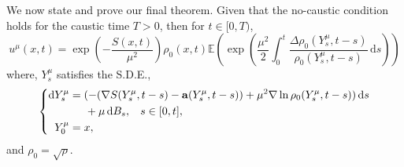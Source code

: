 \documentclass[a4paper,12pt,draft]{report}
\theoremstyle{remark}
\theoremstyle{definition}
\begin{document}
We now state and prove our final theorem.
\theorem
{
Given that the no-caustic condition holds for the caustic time $T > 0$, then for $t \in [0, T)$,
$$
u^\mu(x, t) = \exp\left(-\frac{S(x, t)}{\mu^2}\right)\rho_0(x, t)\mathbb{E}\left(\exp\left(\frac{\mu^2}{2}\int_0^t\frac{\Delta\rho_0(Y_s^\mu, t - s)}{\rho_0(Y_s^\mu, t - s)}\,\mathrm{d}s\right)\right)
$$
where, $Y_s^\mu$ satisfies the S.D.E.,
$$
\left\{
\begin{aligned}
\mathrm{d}Y_s^\mu & = (-(\nabla S(Y_s^\mu, t - s) - \bold{a}(Y_s^\mu, t - s)) + \mu^2\nabla\ln\rho_0(Y_s^\mu, t - s))\,\mathrm{d}s\\
& \hspace{0.5cm} + \mu\,\mathrm{d}B_s, \hspace{0.3cm} s \in [0, t],\\
Y_0^\mu & = x,
\end{aligned}
\right.
$$
and $\rho_0 = \sqrt{\rho}$.
}
\proof
\end{document}
